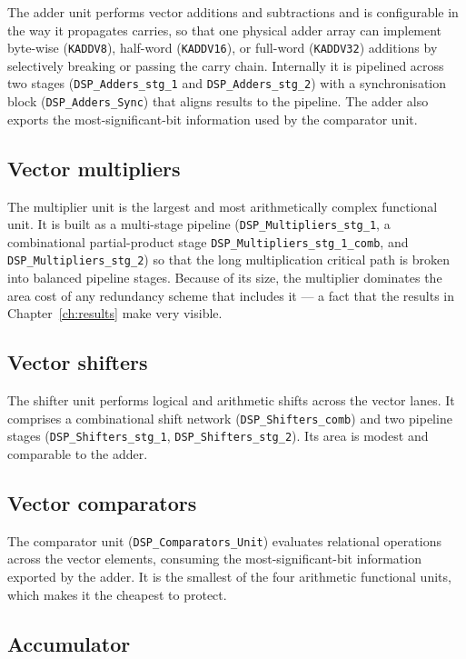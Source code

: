 The adder unit performs vector additions and subtractions and is configurable in
the way it propagates carries, so that one physical adder array can implement
byte-wise (\texttt{KADDV8}), half-word (\texttt{KADDV16}), or full-word
(\texttt{KADDV32}) additions by selectively breaking or passing the carry chain.
Internally it is pipelined across two stages (\texttt{DSP\_Adders\_stg\_1} and
\texttt{DSP\_Adders\_stg\_2}) with a synchronisation block
(\texttt{DSP\_Adders\_Sync}) that aligns results to the pipeline. The adder also
exports the most-significant-bit information used by the comparator unit.

\subsection{Vector multipliers}

The multiplier unit is the largest and most arithmetically complex functional
unit. It is built as a multi-stage pipeline
(\texttt{DSP\_Multipliers\_stg\_1}, a combinational partial-product stage
\texttt{DSP\_Multipliers\_stg\_1\_comb}, and \texttt{DSP\_Multipliers\_stg\_2})
so that the long multiplication critical path is broken into balanced pipeline
stages. Because of its size, the multiplier dominates the area cost of any
redundancy scheme that includes it --- a fact that the results in
Chapter~\ref{ch:results} make very visible.

\subsection{Vector shifters}

The shifter unit performs logical and arithmetic shifts across the vector lanes.
It comprises a combinational shift network (\texttt{DSP\_Shifters\_comb}) and two
pipeline stages (\texttt{DSP\_Shifters\_stg\_1}, \texttt{DSP\_Shifters\_stg\_2}).
Its area is modest and comparable to the adder.

\subsection{Vector comparators}

The comparator unit (\texttt{DSP\_Comparators\_Unit}) evaluates relational
operations across the vector elements, consuming the most-significant-bit
information exported by the adder. It is the smallest of the four arithmetic
functional units, which makes it the cheapest to protect.

\subsection{Accumulator}

